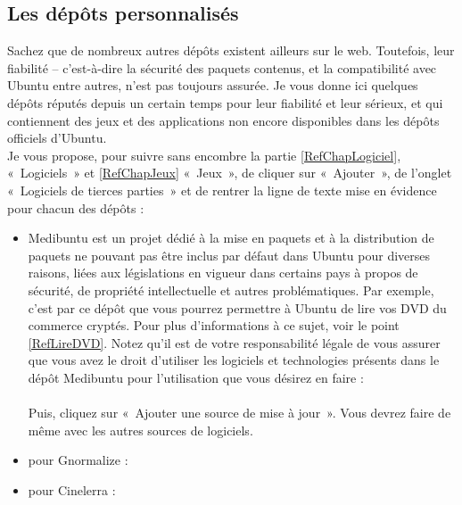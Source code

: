 {\subsection{Les dépôts personnalisés}	
Sachez que de nombreux autres dépôts existent ailleurs sur le web. Toutefois, leur fiabilité -- c'est-à-dire la sécurité des paquets contenus, et la compatibilité avec Ubuntu entre autres, n'est pas toujours assurée. Je vous donne ici quelques dépôts réputés depuis un certain temps pour leur fiabilité et leur sérieux, et qui contiennent des jeux et des applications non encore disponibles dans les dépôts officiels d'Ubuntu.\\
Je vous propose, pour suivre sans encombre la partie \ref{RefChapLogiciel}, «~Logiciels~» et \ref{RefChapJeux} «~Jeux~», de cliquer sur «~Ajouter~», de l'onglet «~Logiciels de tierces parties~» et de rentrer la ligne de texte mise en évidence pour chacun des dépôts :
\begin{itemize}
\item Medibuntu est un projet dédié à la mise en paquets et à la distribution de paquets ne pouvant pas être inclus par défaut dans Ubuntu pour diverses raisons, liées aux législations en vigueur dans certains pays à propos de sécurité, de propriété intellectuelle et autres problématiques. Par exemple, c'est par ce dépôt que vous pourrez permettre à Ubuntu de lire vos DVD du commerce cryptés. Pour plus d'informations à ce sujet, voir le point \ref{RefLireDVD}. Notez qu'il est de votre responsabilité légale de vous assurer que vous avez le droit d'utiliser les logiciels et technologies présents dans le dépôt Medibuntu pour l'utilisation que vous désirez en faire :\\
\\
Puis, cliquez sur «~Ajouter une source de mise à jour~». Vous devrez faire de même avec les autres sources de logiciels.\par
\item pour Gnormalize :\\
\par
\item pour Cinelerra :\\
\par

\end{itemize}}
